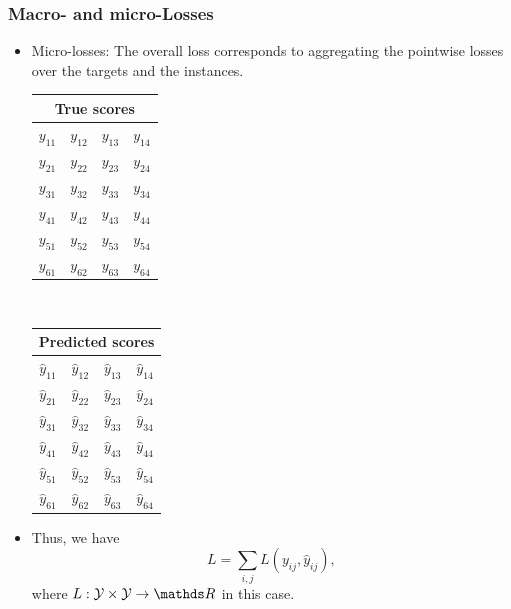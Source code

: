 \documentclass[11pt,compress,t,notes=noshow, xcolor=table]{beamer}
\begin{document}
\begin{frame}
	\frametitle{Macro- and micro-Losses}
	
	\begin{itemize}
		\item<1-> Micro-losses: The overall loss corresponds to aggregating the pointwise losses over the targets and the instances.
		
		\begin{center}
			\begin{tabular}{|c|c|c|c|}
				\multicolumn{4}{c}{True scores} \\
				\hline
				\color{putred}$y_{11}$ & \color{putred}$y_{12}$ & \color{putred}$y_{13}$ & \color{putred}$y_{14}$ \\
				\color{putred}$y_{21}$ & \color{putred}$y_{22}$ & \color{putred}$y_{23}$ & \color{putred}$y_{24}$ \\
				\color{putred}$y_{31}$ & \color{putred}$y_{32}$ & \color{putred}$y_{33}$ & \color{putred}$y_{34}$ \\
				\color{putred}$y_{41}$ & \color{putred}$y_{42}$ & \color{putred}$y_{43}$ & \color{putred}$y_{44}$ \\
				\color{putred}$y_{51}$ & \color{putred}$y_{52}$ & \color{putred}$y_{53}$ & \color{putred}$y_{54}$ \\
				\color{putred}$y_{61}$ & \color{putred}$y_{62}$ & \color{putred}$y_{63}$ & \color{putred}$y_{64}$ \\
				\hline
			\end{tabular}
			$\quad$
			\begin{tabular}{|c|c|c|c|}
				\multicolumn{4}{c}{Predicted scores} \\
				\hline
				\color{putred}$\hat{y}_{11}$ & \color{putred}$\hat{y}_{12}$ & \color{putred}$\hat{y}_{13}$ & \color{putred}$\hat{y}_{14}$ \\
				\color{putred}$\hat{y}_{21}$ & \color{putred}$\hat{y}_{22}$ & \color{putred}$\hat{y}_{23}$ & \color{putred}$\hat{y}_{24}$ \\
				\color{putred}$\hat{y}_{31}$ & \color{putred}$\hat{y}_{32}$ & \color{putred}$\hat{y}_{33}$ & \color{putred}$\hat{y}_{34}$ \\
				\color{putred}$\hat{y}_{41}$ & \color{putred}$\hat{y}_{42}$ & \color{putred}$\hat{y}_{43}$ & \color{putred}$\hat{y}_{44}$ \\
				\color{putred}$\hat{y}_{51}$ & \color{putred}$\hat{y}_{52}$ & \color{putred}$\hat{y}_{53}$ & \color{putred}$\hat{y}_{54}$ \\
				\color{putred}$\hat{y}_{61}$ & \color{putred}$\hat{y}_{62}$ & \color{putred}$\hat{y}_{63}$ & \color{putred}$\hat{y}_{64}$ \\
				\hline
			\end{tabular}
		\end{center}
	\lz
	\item Thus, we have	
	$$
	L =  \sum_{i,j} L(y_{ij} , \hat{y}_{ij}),
	$$
	where $L: \Yspace \times \Yspace \to \R$ in this case.
%	
	\end{itemize}

\end{frame}
\end{document}
